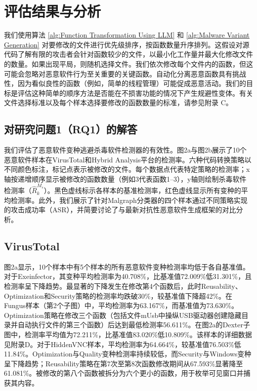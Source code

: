 \section{评估结果与分析}
我们使用算法 \ref{alg:Function Transformation Using LLM} 和 \ref{alg:Malware Variant Generation} 对要修改的文件进行优先级排序，按函数数量升序排列。这假设对源代码了解有限的攻击者会针对函数较少的文件，以最小化工作量并最大化修改文件的数量。如果出现平局，则随机选择文件。我们依次修改每个文件内的函数，但这可能会忽略对恶意软件行为至关重要的关键函数。自动化分离恶意函数具有挑战性，因为看似良性的函数（例如，简单的线程管理）可能促成恶意活动。我们的目标是评估这种简单的顺序方法是否能在不损害功能的情况下产生规避性变体。有关文件选择标准以及每个样本选择要修改的函数数量的标准，请参见附录 C。

\subsection{对研究问题1（RQ1）的解答}
我们评估了恶意软件变种逃避杀毒软件检测器的有效性。图2a与图2b展示了10个恶意软件样本在VirusTotal和Hybrid Analysis平台的检测率。六种代码转换策略以不同颜色标注，标记点表示被修改的文件。每个数据点代表特定策略的检测率；x轴按递增顺序显示被修改的函数数量（例如3代表函数1–3），y轴则绘制杀毒软件检测率（$\hat{R}_k^{M_{s}}$）。黑色虚线标示各样本的基准检测率，红色虚线显示所有变种的平均检测率。此外，我们展示了针对Malgraph分类器的四个样本通过不同策略实现的攻击成功率（ASR），并简要讨论了与最新对抗性恶意软件生成框架的对比分析。

\subsection{VirusTotal}
图2a显示，10个样本中有5个样本的所有恶意软件变种检测率均低于各自基准值。对于Exeinfector，其变种平均检测率为40.708\%，比基准值72.009\%低31.301\%，且检测率呈下降趋势。最显著的下降发生在修改第4个函数后，此时Reusability、Optimization和Security策略的检测率均跌破30\%，较基准值下降超42\%。在Fungus样本（第2个子图）中，平均检测率为63.167\%，而基准值为73.630\%。Optimization策略在修改三个函数（包括文件mUsb中操纵USB驱动器创建隐藏目录并自动执行文件的第三个函数）后达到最低检测率56.611\%。在图2a的Dexter子图中，检测率平均值为72.211\%，比基准值83.020\%低10.809\%。该样本的详细数据见附录D。对于HiddenVNC样本，平均检测率为64.664\%，较基准值76.503\%低11.84\%。Optimization与Quality变种检测率持续较低，而Security与Windows变种呈下降趋势；Reusability策略在第7次至第8次函数修改期间从67.593\%显著降至61.081\%。被修改的第八个函数被拆分为六个更小的函数，用于枚举可见窗口并捕获其内容。


